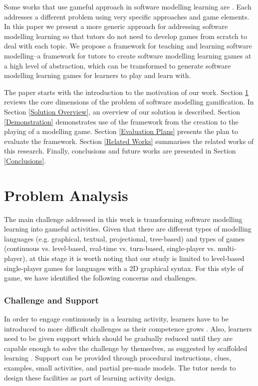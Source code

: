 \documentclass[conference]{IEEEtran}
\begin{document}
Some works that use gameful approach in software modelling learning are 
\cite{Groenewegen2010, Stikkolorum2014, Richardsen2014, Ionita2015,  de2015gamification}. Each addresses a different problem using very specific approaches and game elements. In this paper we present a more generic approach for addressing software modelling learning so that tutors do not need to develop games from scratch to deal with each topic. We propose a framework for teaching and learning software modelling--a framework for tutors to create software modelling learning games at a high level of abstraction, which can be transformed to generate software modelling learning games for learners to play and learn with.

The paper starts with the introduction to the motivation of our work. Section \ref{Problem Analysis} reviews the core dimensions of the problem of software modelling gamification. In Section \ref{Solution Overview}, an overview of our solution is described. Section \ref{Demonstration} demonstrates use of the framework from the creation to the playing of a modelling game. Section \ref{Evaluation Plans} presents the plan to evaluate the framework. Section \ref{Related Works} summarises the related works of this research. Finally, conclusions and future works are presented in Section \ref{Conclusions}.

\section{Problem Analysis}
\label{Problem Analysis}
The main challenge addressed in this work is transforming software modelling learning into gameful activities. Given that there are different types of modelling languages (e.g. graphical, textual, projectional, tree-based) and types of games (continuous vs. level-based, real-time vs. turn-based, single-player vs. multi-player), at this stage it is worth noting that our study is limited to level-based single-player games for languages with a 2D graphical syntax. For this style of game, we have identified the following concerns and challenges.

\subsubsection{Challenge and Support}
\label{Challenge and Support}
In order to engage continuously in a learning activity, learners have to be introduced to more difficult challenges as their competence grows \cite{csikszentmihalyi2014toward}. Also, learners need to be given support which should be gradually reduced until they are capable enough to solve the challenge by themselves, as suggested by scaffolded learning \cite{wood1976role, vygotsky1978mind}. Support can be provided through procedural instructions, clues, examples, small activities, and partial pre-made models. The tutor needs to design these facilities as part of learning activity design. 
\end{document}
